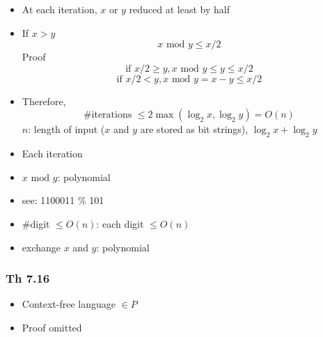 \begin{frame}[allowframebreaks]
\begin{itemize}
\item At each iteration, $x$ or $y$ reduced at least by half 
  
\item If $x > y$
\begin{equation*}
  x \text{ mod } y \leq x/2
\end{equation*}
Proof
\begin{equation*}
  \mbox{if } x/2 \geq y, x \text{ mod } y \leq y \leq x/2
\end{equation*}
\begin{equation*}
  \mbox{if } x/2 < y, x \text{ mod } y = x-y \leq x/2
\end{equation*}
\item Therefore,
  \begin{equation*}
\text{\#iterations } \leq 2\max(\log_2 x, \log_2 y)= O(n)
\end{equation*}
$n$: length of input ($x$ and $y$ are stored as bit strings), $\log_2 x + \log_2 y$
\item Each iteration

\item [] $x \text{ mod } y$:  polynomial

\item [] see: 1100011 \% 101

\item [] \#digit $\leq O(n)$: each digit $\leq O(n)$

\item [] exchange $x$ and $y$: polynomial

\end{itemize}\end{frame}

\begin{frame}[allowframebreaks] \frametitle{Th 7.16}
  \begin{itemize}
\item Context-free language $\in P$


\item Proof omitted
\end{itemize}\end{frame}


